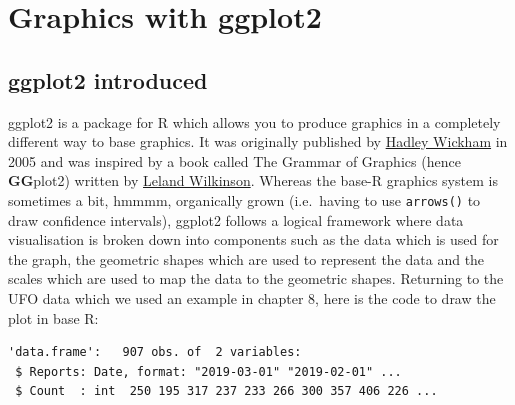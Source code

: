 \documentclass[
]{book}
\newenvironment{Shaded}{\begin{snugshade}}{\end{snugshade}}
\newcommand{\DataTypeTok}[1]{\textcolor[rgb]{0.13,0.29,0.53}{#1}}
\newcommand{\KeywordTok}[1]{\textcolor[rgb]{0.13,0.29,0.53}{\textbf{#1}}}
\newcommand{\NormalTok}[1]{#1}
\newcommand{\OperatorTok}[1]{\textcolor[rgb]{0.81,0.36,0.00}{\textbf{#1}}}
\newcommand{\StringTok}[1]{\textcolor[rgb]{0.31,0.60,0.02}{#1}}
\begin{document}
\hypertarget{graphics-with-ggplot2}{%
\chapter{Graphics with ggplot2}\label{graphics-with-ggplot2}}

\hypertarget{ggplot2-introduced}{%
\section{ggplot2 introduced}\label{ggplot2-introduced}}

ggplot2 is a package for R which allows you to produce graphics in a completely different way to base graphics. It was originally published by \href{https://en.wikipedia.org/wiki/Hadley_Wickham}{Hadley Wickham} in 2005 and was inspired by a book called The Grammar of Graphics (hence \textbf{GG}plot2) written by \href{https://en.wikipedia.org/wiki/Leland_Wilkinson}{Leland Wilkinson}. Whereas the base-R graphics system is sometimes a bit, hmmmm, organically grown (i.e.~having to use \texttt{arrows()} to draw confidence intervals), ggplot2 follows a logical framework where data visualisation is broken down into components such as the data which is used for the graph, the geometric shapes which are used to represent the data and the scales which are used to map the data to the geometric shapes. Returning to the UFO data which we used an example in chapter 8, here is the code to draw the plot in base R:

\begin{verbatim}
'data.frame':   907 obs. of  2 variables:
 $ Reports: Date, format: "2019-03-01" "2019-02-01" ...
 $ Count  : int  250 195 317 237 233 266 300 357 406 226 ...
\end{verbatim}

\begin{Shaded}
\end{Shaded}
\end{document}
